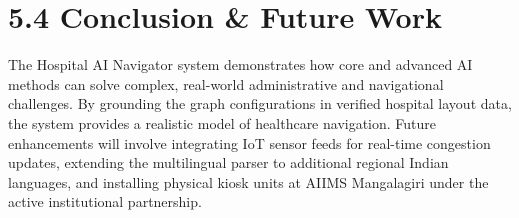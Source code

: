 \documentclass[12pt,a4paper]{report}
\begin{document}
\section{5.4 Conclusion \& Future Work}

The Hospital AI Navigator system demonstrates how core and advanced AI methods can solve complex, real-world administrative and navigational challenges. By grounding the graph configurations in verified hospital layout data, the system provides a realistic model of healthcare navigation. Future enhancements will involve integrating IoT sensor feeds for real-time congestion updates, extending the multilingual parser to additional regional Indian languages, and installing physical kiosk units at AIIMS Mangalagiri under the active institutional partnership.
\end{document}
